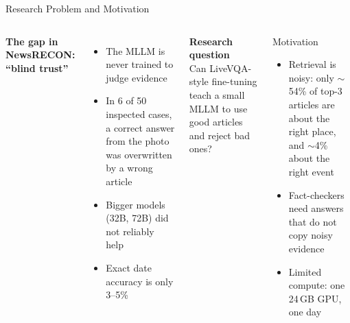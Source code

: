 \documentclass[aspectratio=169,10pt]{beamer}
\begin{document}
\begin{frame}{Research Problem and Motivation}
\begin{columns}[T]
\textbf{The gap in NewsRECON: ``blind trust''}
\begin{itemize}
\item The MLLM is never trained to judge evidence
\item In \alert{6 of 50} inspected cases, a correct answer from the photo was \alert{overwritten} by a wrong article
\item Bigger models (32B, 72B) did not reliably help
\item Exact date accuracy is only 3--5\%
\end{itemize}
\vspace{0.5em}
\textbf{Research question}\\
Can LiveVQA-style fine-tuning teach a \alert{small} MLLM to use good articles and reject bad ones?
\begin{alertblock}{Motivation}
\small
\begin{itemize}
\item Retrieval is noisy: only $\sim$54\% of top-3 articles are about the right place, and $\sim$4\% about the right event
\item Fact-checkers need answers that do not copy noisy evidence
\item Limited compute: one 24\,GB GPU, one day
\end{itemize}
\end{alertblock}
\end{columns}
\end{frame}
\end{document}
